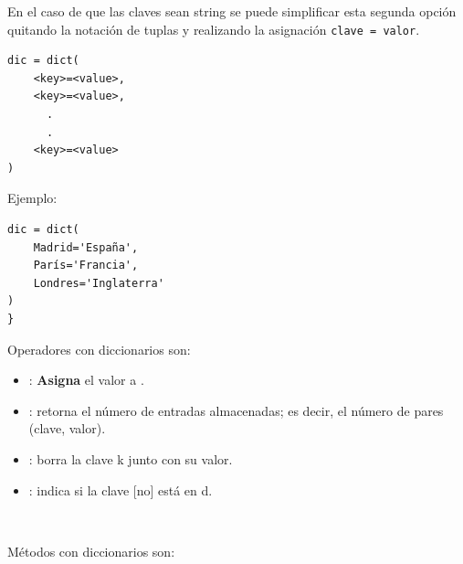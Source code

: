 En el caso de que las claves sean string se puede simplificar esta segunda opción quitando la notación de tuplas y realizando la asignación \texttt{clave = valor}.

\hfil
\begin{minipage}{.3\textwidth}
\begin{Verbatim}[frame=single]
dic = dict(
    <key>=<value>,
    <key>=<value>,
      .
      .
    <key>=<value>
)
\end{Verbatim}
\end{minipage}
\hspace{1cm}
\begin{minipage}{.3\textwidth}
Ejemplo:
\begin{Verbatim}
dic = dict(
    Madrid='España',
    París='Francia',
    Londres='Inglaterra'
)
}
\end{Verbatim}
\end{minipage}


Operadores con diccionarios son:

\begin{itemize}
\item {}: \textbf{Asigna} el valor  a .
\item {}: retorna el número de entradas almacenadas; es decir, el número de pares (clave, valor).
\item {}: borra la clave k junto con su valor.
\item {}: indica si la clave [no] está en d.
\end{itemize}



\

Métodos con diccionarios son:

